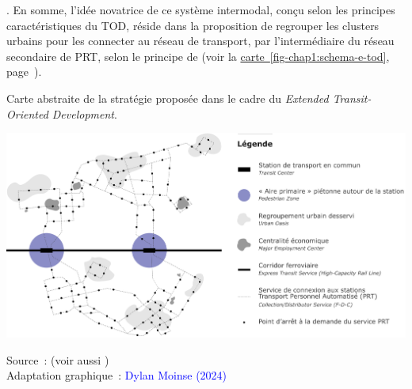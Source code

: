 \begin{refsegment}
{} \textcolor{blue}{\autocite[145]{schneider_prt_1992}}. En somme, l'idée novatrice de ce système intermodal, conçu selon les principes caractéristiques du \acrshort{TOD}, réside dans la proposition de regrouper les clusters urbains pour les connecter au réseau de transport, par l'intermédiaire du réseau secondaire de \acrshort{PRT}, selon le principe de  (voir la \hyperref[fig-chap1:schema-e-tod]{carte~\ref{fig-chap1:schema-e-tod}}, page~\pageref{fig-chap1:schema-e-tod}).%

    \begin{carte}[h!]\vspace*{4pt}
        \caption{Carte abstraite de la stratégie  proposée dans le cadre du \textsl{Extended Transit-Oriented Development}.}
        \label{fig-chap1:schema-e-tod}
        \centerline{\includegraphics[width=1\columnwidth]{src/Figures/Chap-1/FR_Schema_Schneider.pdf}}
        \vspace{5pt}
        \begin{flushright}\scriptsize{
        Source~: \textcolor{blue}{\textcite[142]{schneider_prt_1992}} (voir aussi \textcolor{blue}{\textcite{schneider_illustrating_2012}})
        \\
        Adaptation graphique~: \textcolor{blue}{Dylan Moinse (2024)}
        }\end{flushright}
    \end{carte}


\end{refsegment}
